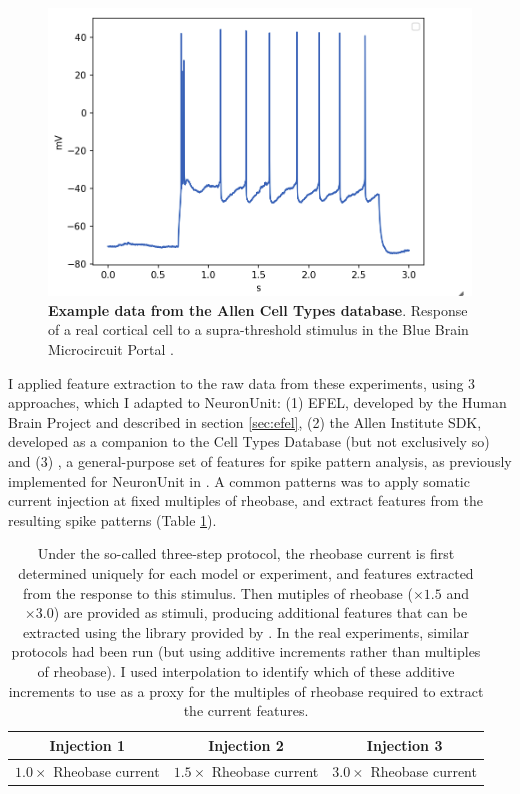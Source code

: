 \begin{figure}  
    \begin{center}
    \includegraphics[width=0.6\linewidth]{figures/multi_spiking_large_bbp}
    \caption[Example from BBP]{\textbf{Example data from the Allen Cell Types database}.
    Response of a real cortical cell to a supra-threshold stimulus in the Blue Brain Microcircuit Portal \citep{toledo}.}
    \label{fig:bbp_trace_adaption_late_spike}
    \end{center}
\end{figure}    

I applied feature extraction to the raw data from these experiments, using 3 approaches, which I adapted to NeuronUnit: (1) EFEL, developed by the Human Brain Project and described in section \ref{sec:efel}, (2) the Allen Institute SDK, developed as a companion to the Cell Types Database (but not exclusively so) and (3) \cite{druckmann2013hierarchical}, a general-purpose set of features for spike pattern analysis, as previously implemented for NeuronUnit in \cite{birgiolas2019towards}.
A common patterns was to apply somatic current injection at fixed multiples of rheobase, and extract features from the resulting spike patterns (Table \ref{table:three-step-stim}).

\begin{table}
\begin{center}
\begin{tabular}{|c|c|c|}
\toprule
Injection 1 & Injection 2 & Injection 3 \\
 \midrule
 $1.0 \times$ Rheobase current & $1.5 \times$ Rheobase current & $3.0 \times$ Rheobase current\\
\bottomrule
\end{tabular}
\caption[Three Step Stimulus Protocol]{Under the so-called three-step protocol, the rheobase current is first determined uniquely for each model or experiment, and features extracted from the response to this stimulus.
Then mutiples of rheobase ($\times 1.5$ and $\times 3.0$) are provided as stimuli, producing additional features that can be extracted using the library provided by \cite{EFEL}.
In the real experiments, similar protocols had been run (but using additive increments rather than multiples of rheobase).
I used interpolation to identify which of these additive increments to use as a proxy for the multiples of rheobase required to extract the current features.}
\label{table:three-step-stim}
\end{center}
\end{table}

